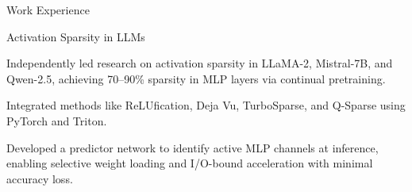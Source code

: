 \documentclass{resume} %
\begin{document}
\begin{rSection}{Work Experience}
    \begin{rSubsection}{Activation Sparsity in LLMs}{}{}{}
        \item Independently led research on activation sparsity in LLaMA-2, Mistral-7B, and Qwen-2.5, achieving 70–90\% sparsity in MLP layers via continual pretraining.
        \item Integrated methods like ReLUfication, Deja Vu, TurboSparse, and Q-Sparse using PyTorch and Triton.
        \item Developed a predictor network to identify active MLP channels at inference, enabling selective weight loading and I/O-bound acceleration with minimal accuracy loss.
    \end{rSubsection}
\end{rSection}


\end{document}
